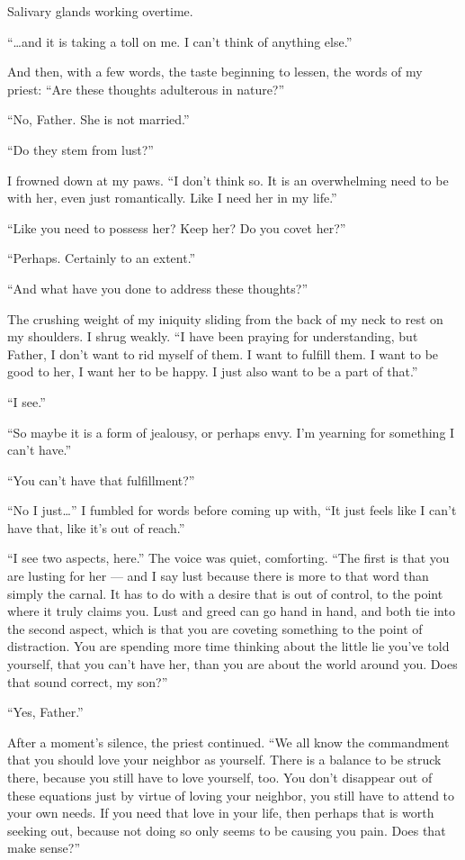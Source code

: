 Salivary glands working overtime.

``\ldots and it is taking a toll on me. I can't think of anything else.''

And then, with a few words, the taste beginning to lessen, the words of my priest: ``Are these thoughts adulterous in nature?''

``No, Father. She is not married.''

``Do they stem from lust?''

I frowned down at my paws. ``I don't think so. It is an overwhelming need to be with her, even just romantically. Like I need her in my life.''

``Like you need to possess her? Keep her? Do you covet her?''

``Perhaps. Certainly to an extent.''

``And what have you done to address these thoughts?''

The crushing weight of my iniquity sliding from the back of my neck to rest on my shoulders. I shrug weakly. ``I have been praying for understanding, but Father, I don't want to rid myself of them. I want to fulfill them. I want to be good to her, I want her to be happy. I just also want to be a part of that.''

``I see.''

``So maybe it is a form of jealousy, or perhaps envy. I'm yearning for something I can't have.''

``You can't have that fulfillment?''

``No I just\ldots{}'' I fumbled for words before coming up with, ``It just feels like I can't have that, like it's out of reach.''

``I see two aspects, here.'' The voice was quiet, comforting. ``The first is that you are lusting for her --- and I say lust because there is more to that word than simply the carnal. It has to do with a desire that is out of control, to the point where it truly claims you. Lust and greed can go hand in hand, and both tie into the second aspect, which is that you are coveting something to the point of distraction. You are spending more time thinking about the little lie you've told yourself, that you can't have her, than you are about the world around you. Does that sound correct, my son?''

``Yes, Father.''

After a moment's silence, the priest continued. ``We all know the commandment that you should love your neighbor as yourself. There is a balance to be struck there, because you still have to love yourself, too. You don't disappear out of these equations just by virtue of loving your neighbor, you still have to attend to your own needs. If you need that love in your life, then perhaps that is worth seeking out, because not doing so only seems to be causing you pain. Does that make sense?''

